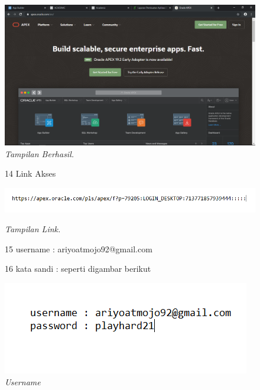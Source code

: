 \begin{enumerate}
\begin{figure}
    \begin{center}
\includegraphics[scale=0.2]{figures/13.png}
    \caption{\textit{Tampilan Berhasil.}}
        \end{center}
\label{gambar}
\end{figure}


\begin{figure}

\item[14] Link Akses 
    \begin{center}
\includegraphics[scale=0.7]{figures/15.PNG}
    \caption{\textit{Tampilan Link.}}
        \end{center}
\item[15] username   : ariyoatmojo92@gmail.com
\item[16] kata sandi : seperti digambar berikut
    \begin{center}
\includegraphics[scale=0.9]{figures/14.png}
    \caption{\textit{Username}}
        \end{center}
\label{gambar}
\end{figure}

\end{enumerate}
